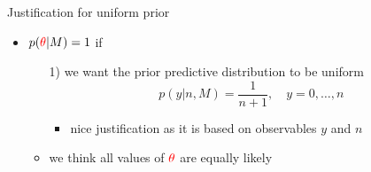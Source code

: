 \documentclass[english,t]{beamer}
\begin{document}
\begin{frame}{Justification for uniform prior}

  \begin{itemize}
  \item $p({\color{red}\theta}|M)=1$ if
    \begin{itemize}
    \item[1)] we want the prior predictive distribution to be uniform
      \begin{equation*}
        p(y|n,M) = \frac{1}{n+1}, \quad y=0,\ldots,n
      \end{equation*}
      \begin{itemize}
      \item nice justification as it is based on observables $y$ and $n$
      \end{itemize}
    \item<2->[2)] we think all values of ${\color{red}\theta}$ are equally likely
    \end{itemize} 
  \end{itemize}

\end{frame}
\end{document}
